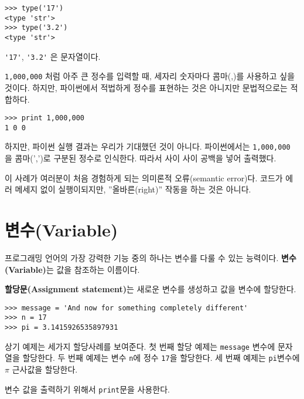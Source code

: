 
\beforeverb
\begin{verbatim}
>>> type('17')
<type 'str'>
>>> type('3.2')
<type 'str'>
\end{verbatim}
\afterverb
%

\verb"'17'", \verb"'3.2'" 은 문자열이다.

{\tt 1,000,000} 처럼 아주 큰 정수를 입력할 때, 세자리 숫자마다 콤마(,)를 사용하고 싶을 것이다. 하지만, 파이썬에서 적법하게 정수를 표현하는 것은 아니지만 문법적으로는 적합하다.

\beforeverb
\begin{verbatim}
>>> print 1,000,000
1 0 0
\end{verbatim}
\afterverb
%

하지만, 파이썬 실행 결과는 우리가 기대했던 것이 아니다. 파이썬에서는 {\tt 1,000,000} 을 콤마(',')로 구분된 정수로 인식한다. 따라서 사이 사이 공백을 넣어 출력했다.


이 사례가 여러분이 처음 경험하게 되는 의미론적 오류(semantic error)다. 
코드가 에러 메세지 없이 실행이되지만, ''올바른(right)'' 작동을 하는 것은 아니다.

\section{변수(Variable)}

프로그래밍 언어의 가장 강력한 기능 중의 하나는 변수를 다룰 수 있는 능력이다. {\bf 변수(Variable)}는 값을 참조하는 이름이다.

{\bf 할당문(Assignment statement)}는 새로운 변수를 생성하고 값을 변수에 할당한다.

\beforeverb
\begin{verbatim}
>>> message = 'And now for something completely different'
>>> n = 17
>>> pi = 3.1415926535897931
\end{verbatim}
\afterverb
%

상기 예제는 세가지 할당사례를 보여준다. 첫 번째 할당 예제는 {\tt message} 변수에 문자열을 할당한다. 두 번째 예제는 변수 {\tt n}에 정수 {\tt 17}을 할당한다. 세 번째 예제는 {\tt pi}변수에 $\pi$ 근사값을 할당한다.

변수 값을 출력하기 위해서 {\tt print}문을 사용한다.

